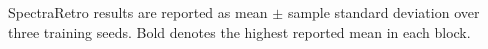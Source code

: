 \begin{table}[!tp]
\par\vspace{3pt}
\begin{minipage}{\textwidth}
\fontsize{7.5}{9}\selectfont
SpectraRetro results are reported as mean $\pm$ sample standard
deviation over three training seeds.
Bold denotes the highest reported mean in each block.
\end{minipage}

\endgroup
\end{table}